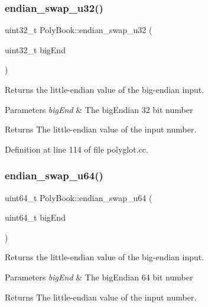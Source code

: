 \subsubsection{\texorpdfstring{endian\+\_\+swap\+\_\+u32()}{endian\_swap\_u32()}}
{\footnotesize\ttfamily uint32\+\_\+t Poly\+Book\+::endian\+\_\+swap\+\_\+u32 (\begin{DoxyParamCaption}\item[{uint32\+\_\+t}]{big\+End }\end{DoxyParamCaption})\hspace{0.3cm}{\ttfamily [private]}}



Returns the little-\/endian value of the big-\/endian input. 


\begin{DoxyParams}{Parameters}
{\em big\+End} & The big\+Endian 32 bit number \\
\hline
\end{DoxyParams}
\begin{DoxyReturn}{Returns}
The little-\/endian value of the input number. 
\end{DoxyReturn}


Definition at line 114 of file polyglot.\+cc.

\mbox{\label{classPolyBook_acb13b8524d6af4dd768072404dcd8488}} 
\subsubsection{\texorpdfstring{endian\+\_\+swap\+\_\+u64()}{endian\_swap\_u64()}}
{\footnotesize\ttfamily uint64\+\_\+t Poly\+Book\+::endian\+\_\+swap\+\_\+u64 (\begin{DoxyParamCaption}\item[{uint64\+\_\+t}]{big\+End }\end{DoxyParamCaption})\hspace{0.3cm}{\ttfamily [private]}}



Returns the little-\/endian value of the big-\/endian input. 


\begin{DoxyParams}{Parameters}
{\em big\+End} & The big\+Endian 64 bit number \\
\hline
\end{DoxyParams}
\begin{DoxyReturn}{Returns}
The little-\/endian value of the input number. 
\end{DoxyReturn}


